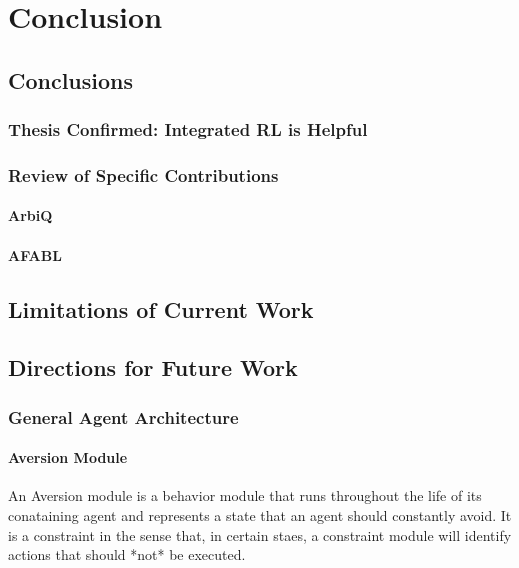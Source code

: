 \chapter{Conclusion}\label{ch:conclusion}

\section{Conclusions}

\subsection{Thesis Confirmed: Integrated RL is Helpful}

\subsection{Review of Specific Contributions}

\subsubsection{ArbiQ}

\subsubsection{AFABL}

\section{Limitations of Current Work}

\section{Directions for Future Work}

\subsection{General Agent Architecture}

\subsubsection{Aversion Module}

An Aversion module is a behavior module that runs throughout the life
of its conataining agent and represents a state that an agent should
constantly avoid.  It is a constraint in the sense that, in certain
staes, a constraint module will identify actions that should *not* be
executed.


